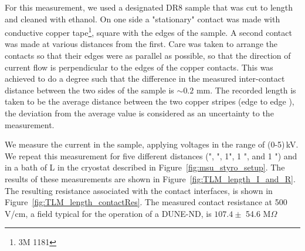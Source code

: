 \documentclass[a4paper,12pt]{article}
\newcommand{\DR}{DR8}
\begin{document}
For this measurement, we used a designated {\DR} sample that  was cut to length and cleaned with ethanol.  On one side a "stationary" contact was made with conductive copper tape\footnote{3M 1181}, square with the edges of the sample.  A second contact was made at various distances from the first.  Care was taken to arrange the contacts so that their edges were as parallel as possible, so that the direction of current flow is perpendicular to the edges of the copper contacts.  This was achieved to do a degree such that the difference in the measured inter-contact distance between the two sides of the sample is $\sim 0.2\,$\,mm.  The recorded length is taken to be the average distance between the two copper stripes (edge to edge ), the deviation from the average value is considered as an uncertainty to the measurement.

We measure the current in the sample, applying voltages in the range of (0-5)\,kV. We repeat this measurement for five different distances (", ", 1", 1 ", and 1 ") and in a bath of L in the cryostat described in Figure~\ref{fig:msu_styro_setup}. The results of these measurements are shown in Figure~\ref{fig:TLM_length_I_and_R}. The resulting resistance associated with the contact interfaces, is shown in Figure~\ref{fig:TLM_length_contactRes}.  The measured contact resistance at 500\,V/cm, a field typical for the operation of a DUNE-ND, is $107.4\pm$ 54.6 M$\Omega$
\end{document}
